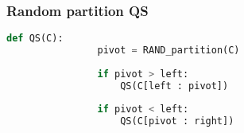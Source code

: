     \subsubsection{Random partition QS}
    \begin{definition}
        \begin{lstlisting}[language=Python, caption={QuickSort with Random Partition}]
            def QS(C):
                pivot = RAND_partition(C)
                
                if pivot > left:
                    QS(C[left : pivot])
                    
                if pivot < left:
                    QS(C[pivot : right])
            \end{lstlisting}            
    \end{definition}

